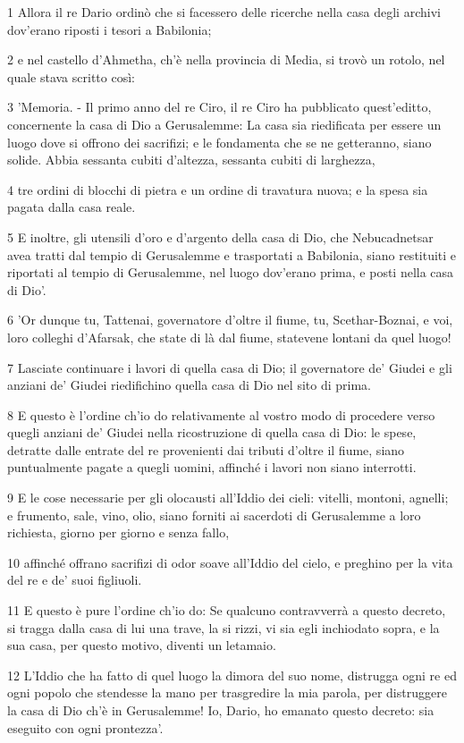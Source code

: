 \par 1 Allora il re Dario ordinò che si facessero delle ricerche nella casa degli archivi dov'erano riposti i tesori a Babilonia;
\par 2 e nel castello d'Ahmetha, ch'è nella provincia di Media, si trovò un rotolo, nel quale stava scritto così:
\par 3 'Memoria. - Il primo anno del re Ciro, il re Ciro ha pubblicato quest'editto, concernente la casa di Dio a Gerusalemme: La casa sia riedificata per essere un luogo dove si offrono dei sacrifizi; e le fondamenta che se ne getteranno, siano solide. Abbia sessanta cubiti d'altezza, sessanta cubiti di larghezza,
\par 4 tre ordini di blocchi di pietra e un ordine di travatura nuova; e la spesa sia pagata dalla casa reale.
\par 5 E inoltre, gli utensili d'oro e d'argento della casa di Dio, che Nebucadnetsar avea tratti dal tempio di Gerusalemme e trasportati a Babilonia, siano restituiti e riportati al tempio di Gerusalemme, nel luogo dov'erano prima, e posti nella casa di Dio'.
\par 6 'Or dunque tu, Tattenai, governatore d'oltre il fiume, tu, Scethar-Boznai, e voi, loro colleghi d'Afarsak, che state di là dal fiume, statevene lontani da quel luogo!
\par 7 Lasciate continuare i lavori di quella casa di Dio; il governatore de' Giudei e gli anziani de' Giudei riedifichino quella casa di Dio nel sito di prima.
\par 8 E questo è l'ordine ch'io do relativamente al vostro modo di procedere verso quegli anziani de' Giudei nella ricostruzione di quella casa di Dio: le spese, detratte dalle entrate del re provenienti dai tributi d'oltre il fiume, siano puntualmente pagate a quegli uomini, affinché i lavori non siano interrotti.
\par 9 E le cose necessarie per gli olocausti all'Iddio dei cieli: vitelli, montoni, agnelli; e frumento, sale, vino, olio, siano forniti ai sacerdoti di Gerusalemme a loro richiesta, giorno per giorno e senza fallo,
\par 10 affinché offrano sacrifizi di odor soave all'Iddio del cielo, e preghino per la vita del re e de' suoi figliuoli.
\par 11 E questo è pure l'ordine ch'io do: Se qualcuno contravverrà a questo decreto, si tragga dalla casa di lui una trave, la si rizzi, vi sia egli inchiodato sopra, e la sua casa, per questo motivo, diventi un letamaio.
\par 12 L'Iddio che ha fatto di quel luogo la dimora del suo nome, distrugga ogni re ed ogni popolo che stendesse la mano per trasgredire la mia parola, per distruggere la casa di Dio ch'è in Gerusalemme! Io, Dario, ho emanato questo decreto: sia eseguito con ogni prontezza'.
